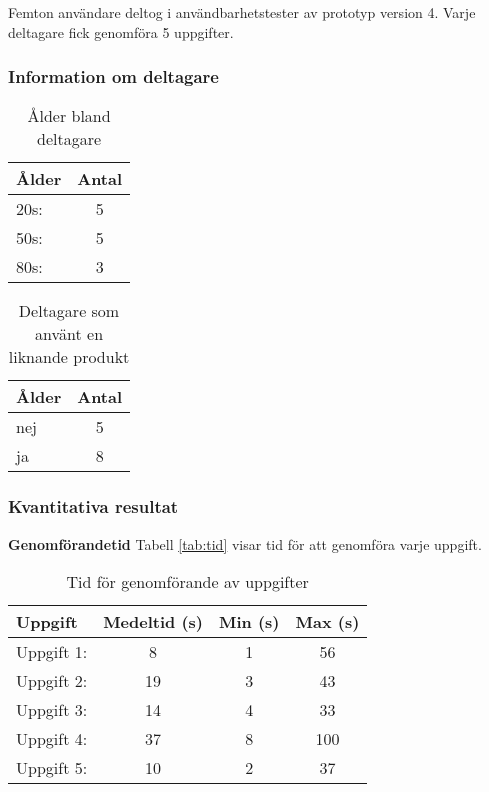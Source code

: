Femton användare deltog i användbarhetstester av prototyp version 4. Varje deltagare fick genomföra 5 uppgifter. 

\subsubsection{Information om deltagare}

\begin{table}[H]
\centering
\begin{tabular}{|l|c|}
\hline
\textbf{Ålder} & \textbf{Antal} \\
\hline
20s:  & 5  \\ 
50s:  & 5  \\
80s:  & 3  \\
\hline
\end{tabular}
\caption{Ålder bland deltagare}
\label{tab:age3}
\end{table}

\begin{table}[H]
\centering
\begin{tabular}{|l|c|}
\hline
\textbf{Ålder} & \textbf{Antal} \\
\hline
nej  & 5   \\
ja  & 8  \\
\hline
\end{tabular}
\caption{Deltagare som använt en liknande produkt}
\label{tab:exp3}
\end{table}

\subsubsection{Kvantitativa resultat}

\textbf{Genomförandetid}
Tabell \ref{tab:tid} visar tid för att genomföra varje uppgift.
\begin{table}[H]
\centering
\begin{tabular}{|l|c|c|c|}
\hline
\textbf{Uppgift} & \textbf{Medeltid (s)} & \textbf{Min (s)} & \textbf{Max (s)} \\
\hline
Uppgift 1:  & 8 & 1 & 56 \\
Uppgift 2:  & 19 & 3 & 43\\
Uppgift 3:  & 14 & 4 & 33\\
Uppgift 4:  & 37 & 8 & 100\\
Uppgift 5:  & 10 & 2 & 37\\
\hline
\end{tabular}
\caption{Tid för genomförande av uppgifter}
\label{tab:tid4}
\end{table}


